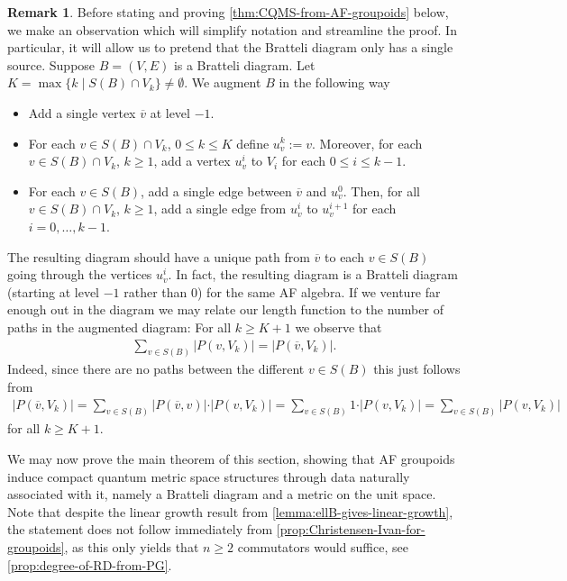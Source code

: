 \documentclass[11pt,a4paper,oneside,final,reqno]{amsart}
\theoremstyle{definition}
\newtheorem{remark}[lemma]{Remark}
\numberwithin{equation}{section}
\begin{document}
	\begin{remark}\label{remark:ghost-paths}
		Before stating and proving \cref{thm:CQMS-from-AF-groupoids} below, we make an observation which will simplify notation and streamline the proof. In particular, it will allow us to pretend that the Bratteli diagram only has a single source. Suppose $B = (V,E)$ is a Bratteli diagram. Let $K = \max\{ k \mid S(B) \cap V_k \} \neq \emptyset$. We augment $B$ in the following way
		\begin{itemize}
			\item Add a single vertex $\overline{v}$ at level $-1$.
			\item For each $v \in S(B) \cap V_k$, $0 \leq k\leq K$ define $u_v^k := v$. Moreover, for each $v \in S(B) \cap V_k$, $k \geq 1$, add a vertex $u_v^{i}$ to $V_i$ for each $0 \leq i \leq k-1$. 
			\item For each $v \in S(B)$, add a single edge between $\overline{v}$ and $u_v^0$.  
			Then, for all $v \in S(B) \cap V_k$, $k\geq 1$, add a single edge from $u_v^{i}$ to $u_v^{i+1}$ for each $i=0, \ldots, k-1$.
		\end{itemize}
		The resulting diagram should have a unique path from $\overline{v}$ to each $v \in S(B)$ going through the vertices $u_v^i$. 
		In fact, the resulting diagram is a Bratteli diagram (starting at level $-1$ rather than $0$) for the same AF algebra.  
		If we venture far enough out in the diagram we may relate our length function to the number of paths in the augmented diagram: 
		For all $k \geq K +1$ we observe that
		\begin{align*}
			\sum_{v \in S(B) } \vert P(v, V_k) \vert = \vert P(\overline{v}, V_k) \vert .
		\end{align*}
		Indeed,  since there are no paths between the different $v \in S(B)$ this just follows from 
		\begin{align*}
			\vert P(\overline{v}, V_k) \vert = \sum_{v \in S(B)}\vert P(\overline{v}, v)\vert \cdot \vert P(v, V_k)\vert = \sum_{v \in S(B)} 1 \cdot \vert P(v, V_k)\vert = \sum_{v \in S(B)}\vert P(v, V_k)\vert
		\end{align*}
	for all $k \geq K+1$.  
	\end{remark}
	
		We may now prove the main theorem of this section, showing that AF groupoids  induce compact quantum metric space structures through data naturally associated with it, namely a Bratteli diagram and a metric on the unit space. Note that despite the linear growth result from \cref{lemma:ellB-gives-linear-growth}, the statement does not follow immediately from \cref{prop:Christensen-Ivan-for-groupoids}, 
		as this only yields that $n\geq 2$ commutators would suffice, see \cref{prop:degree-of-RD-from-PG}.   
\end{document}
